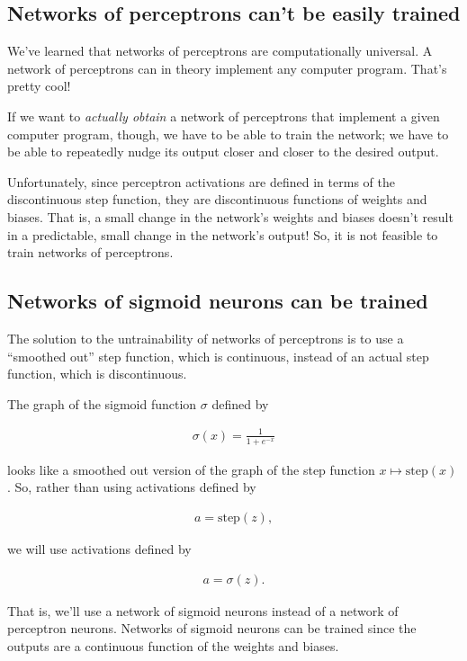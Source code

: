 \documentclass{article}
\begin{document}
	\subsection*{Networks of perceptrons can't be easily trained}
	
	We've learned that networks of perceptrons are computationally universal. A network of perceptrons can in theory implement any computer program. That's pretty cool!
	
	If we want to \textit{actually obtain} a network of perceptrons that implement a given computer program, though, we have to be able to train the network; we have to be able to repeatedly nudge its output closer and closer to the desired output.
	
	Unfortunately, since perceptron activations are defined in terms of the discontinuous step function, they are discontinuous functions of weights and biases. That is, a small change in the network's weights and biases doesn't result in a predictable, small change in the network's output! So, it is not feasible to train networks of perceptrons.
	
	\subsection*{Networks of sigmoid neurons can be trained}
	
	The solution to the untrainability of networks of perceptrons is to use a ``smoothed out'' step function, which is continuous, instead of an actual step function, which is discontinuous.
	
	The graph of the sigmoid function $\sigma$ defined by
	
	\begin{align*}
		\sigma(x) = \frac{1}{1 + e^{-x}}
	\end{align*}
	
	looks like a smoothed out version of the graph of the step function $x \mapsto \text{step}(x)$. So, rather than using activations defined by 
	
	\begin{align*}
		a = \text{step}(z),
	\end{align*}
	
	we will use activations defined by
	
	\begin{align*}
		a = \sigma(z).
	\end{align*}
	
	That is, we'll use a network of sigmoid neurons instead of a network of perceptron neurons. Networks of sigmoid neurons can be trained since the outputs are a continuous function of the weights and biases.
	
\end{document}
